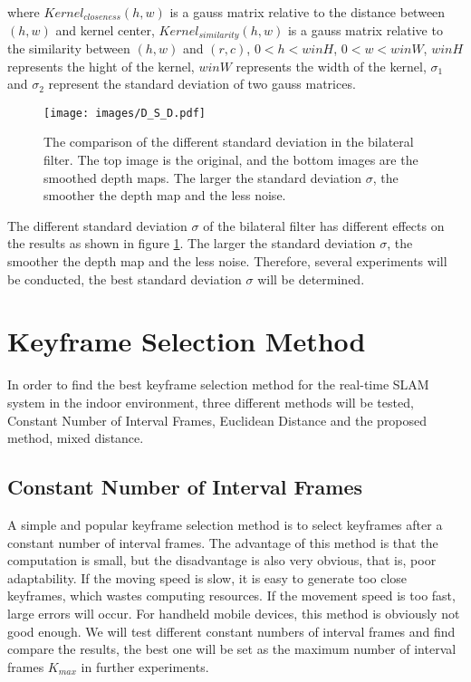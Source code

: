 where $Kernel_{closeness}(h,w)$ is a gauss matrix relative to the distance between $(h,w)$ and kernel center, $Kernel_{similarity}(h,w)$ is a gauss matrix relative to the similarity between $(h,w)$ and $(r,c)$, $0<h<winH$, $0<w<winW$, $winH$ represents the hight of the kernel, $winW$ represents the width of the kernel, $\sigma_{1}$ and $\sigma_2$ represent the standard deviation of two gauss matrices.
\begin{figure}[thb]
    \centering
    \texttt{[image: images/D\_S\_D.pdf]}
    \caption[The comparison of the different standard deviation in bilateral filter]{The comparison of the different standard deviation in the bilateral filter. The top image is the original, and the bottom images are the smoothed depth maps. The larger the standard deviation $\sigma$, the smoother the depth map and the less noise.}\label{D_S_D_F}
\end{figure}

The different standard deviation $\sigma$ of the bilateral filter has different effects on the results as shown in figure \ref{D_S_D_F}. The larger the standard deviation $\sigma$, the smoother the depth map and the less noise. Therefore, several experiments will be conducted, the best standard deviation $\sigma$ will be determined.

\section{Keyframe Selection Method}
\label{K_S_M}

In order to find the best keyframe selection method for the real-time SLAM system in the indoor environment, three different methods will be tested, Constant Number of Interval Frames, Euclidean Distance and the proposed method, mixed distance.

\subsection{Constant Number of Interval Frames}
A simple and popular keyframe selection method is to select keyframes after a constant number of interval frames. The advantage of this method is that the computation is small, but the disadvantage is also very obvious, that is, poor adaptability. If the moving speed is slow, it is easy to generate too close keyframes, which wastes computing resources. If the movement speed is too fast, large errors will occur. For handheld mobile devices, this method is obviously not good enough. We will test different constant numbers of interval frames and find compare the results, the best one will be set as the maximum number of interval frames $K_{max}$ in further experiments.

